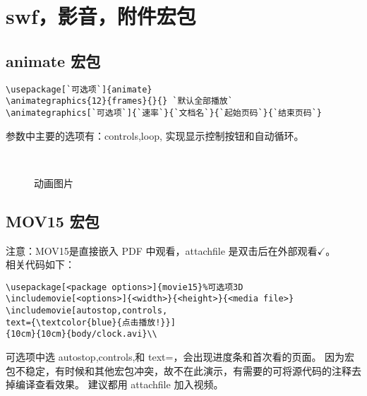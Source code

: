 \section{swf，影音，附件宏包}
\subsection{animate 宏包}

\begin{lstlisting}
\usepackage[`可选项`]{animate}
\animategraphics{12}{frames}{}{} `默认全部播放`
\animategraphics[`可选项`]{`速率`}{`文档名`}{`起始页码`}{`结束页码`}
\end{lstlisting}

参数中主要的选项有：controls,loop, 实现显示控制按钮和自动循环。

\begin{figure}[htbp]%
\centering
{}\\
\caption{动画图片} \label{mov}
\end{figure}


\subsection{MOV15 宏包}

\color{red}
注意：MOV15是直接嵌入 PDF 中观看，attachfile 是双击后在外部观看$\checkmark $。\\
\normalcolor
相关代码如下：
\begin{shaded}
\begin{Verbatim}
\usepackage[<package options>]{movie15}%可选项3D
\includemovie[<options>]{<width>}{<height>}{<media file>}
\includemovie[autostop,controls,
text={\textcolor{blue}{点击播放!}}]
{10cm}{10cm}{body/clock.avi}\\
\end{Verbatim}
\end{shaded}


可选项中选 autostop,controls,和 text={}，会出现进度条和首次看的页面。
因为宏包不稳定，有时候和其他宏包冲突，故不在此演示，有需要的可将源代码的注释去掉编译查看效果。
建议都用 attachfile 加入视频。

